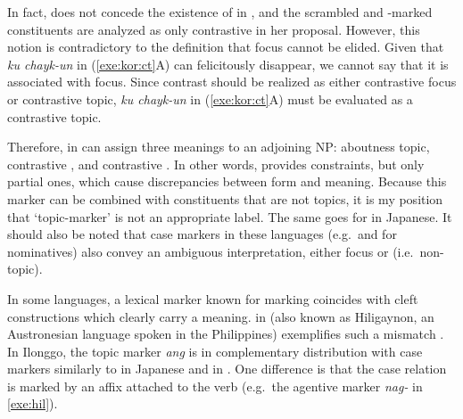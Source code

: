 
\noindent In fact, \citeauthor{choi:99} does not concede the existence
of  in , and the scrambled and
\onun-marked constituents are analyzed as only contrastive  in her
proposal. However, this notion is contradictory to the definition that
focus cannot be elided. Given that \textit{ku chayk-un} in
(\ref{exe:kor:ct}A) can felicitously disappear, we cannot say that it
is associated with focus. Since contrast should be realized as either
contrastive focus or contrastive topic, \textit{ku chayk-un} in
(\ref{exe:kor:ct}A) must be evaluated as a contrastive topic.


Therefore, \nun in  can assign three meanings to an
adjoining NP: aboutness topic, contrastive , and
contrastive .  In other words, \nun provides constraints,
but only partial ones, which cause discrepancies between form and
meaning.  Because this marker can be combined with constituents that
are not topics, it is my position that `topic-marker' is not an
appropriate label.  The same goes for \wa in Japanese.  It should also
be noted that case markers in these languages (e.g.\ \ika and \ga for
nominatives) also convey an ambiguous interpretation, either focus or
 (i.e.\ non-topic).



In some languages, a lexical marker known for marking 
coincides with cleft constructions which clearly carry a 
meaning.  in  (also known as
Hiligaynon, an Austronesian language spoken in the Philippines)
exemplifies such a mismatch \citep{schachter:73}. In Ilonggo, the
topic marker \textit{ang} is in complementary distribution with case
markers similarly to \wa in Japanese and \nun in . One
difference is that the case relation is marked by an affix attached to
the verb (e.g.\ the agentive marker \textit{nag-} in \ref{exe:hil}).



